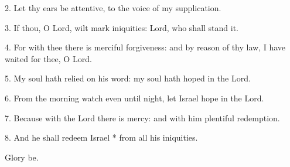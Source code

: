 
2. Let thy ears be attentive, to the voice of my supplication.

3. If thou, O Lord, wilt mark iniquities: Lord, who shall stand it.

4. For with thee there is merciful forgiveness: and by reason of thy law, I have waited for thee, O Lord.

5. My soul hath relied on his word: my soul hath hoped in the Lord.

6. From the morning watch even until night, let Israel hope in the Lord.

7. Because with the Lord there is mercy: and with him plentiful redemption.

8. And he shall redeem Israel * from all his iniquities.

Glory be.

